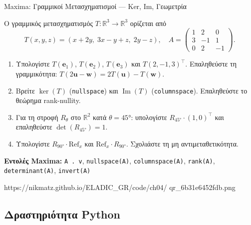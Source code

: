 %

\casactivbox%
  {Maxima: Γραμμικοί Μετασχηματισμοί — Ker, Im, Γεωμετρία}%
  {%
    \label{cas:ch4_linear_transforms}
    Ο γραμμικός μετασχηματισμός $T:\mathbb{R}^3\to\mathbb{R}^3$ ορίζεται από
    \[
      T(x,y,z) = (x+2y,\; 3x-y+z,\; 2y-z),
      \quad
      A = \begin{pmatrix} 1 & 2 & 0 \\ 3 & -1 & 1 \\ 0 & 2 & -1 \end{pmatrix}.
    \]
    \begin{enumerate}[label=(\alph*),itemsep=2pt]
      \item Υπολογίστε $T(\mathbf{e}_1)$, $T(\mathbf{e}_2)$, $T(\mathbf{e}_3)$
        και $T(2,-1,3)^{\top}$. Επαληθεύστε τη γραμμικότητα:
        $T(2\mathbf{u}-\mathbf{w}) = 2T(\mathbf{u})-T(\mathbf{w})$.
      \item Βρείτε $\ker(T)$ (\texttt{nullspace}) και $\operatorname{Im}(T)$
        (\texttt{columnspace}). Επαληθεύστε το θεώρημα rank-nullity.
      \item Για τη στροφή $R_\theta$ στο $\mathbb{R}^2$ κατά $\theta=45°$:
        υπολογίστε $R_{45°}\cdot(1,0)^\top$ και επαληθεύστε $\det(R_{45°})=1$.
      \item Υπολογίστε $R_{90°}\cdot \text{Ref}_x$ και $\text{Ref}_x\cdot R_{90°}$.
        Σχολιάστε τη μη αντιμεταθετικότητα.
    \end{enumerate}
    \smallskip
    \textbf{Εντολές Maxima:}
    \texttt{A . v}, \texttt{nullspace(A)}, \texttt{columnspace(A)},
    \texttt{rank(A)}, \texttt{determinant(A)}, \texttt{invert(A)}
  }%
  {https://nikmatz.github.io/ELADIC_GR/code/ch04/}%
  {qr_6b31e6452fdb.png}

\subsection*{Δραστηριότητα Python}

